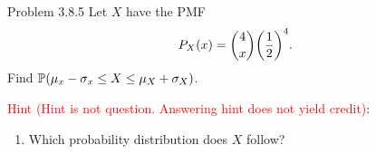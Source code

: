 \begin{problem}{Problem 3.8.5}
    Let $X$ have the PMF \[P_X(x)=\binom{4}{x}\parens*{\frac{1}{2}}^4.\]
    Find $\P{\mu_x-\sigma_x\leq X\leq \mu_X+\sigma_X}$.

    \textcolor{red}{Hint (Hint is not question. Answering hint does not yield credit)}:
    \begin{enumerate}
        \item Which probability distribution does $X$ follow?
    \end{enumerate}
\end{problem}
